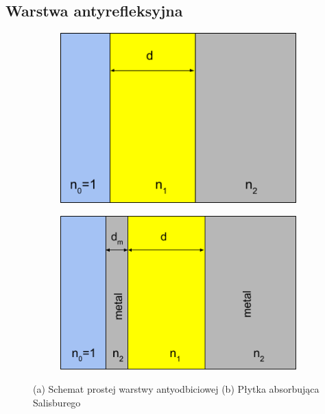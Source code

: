 \subsection{Warstwa antyrefleksyjna}
\begin{figure}[htb]
	\centering
        \begin{subfigure}{0.42\textwidth}
		\includegraphics[width=\textwidth]{images/pml/antiref.png}
                \caption{}
		\label{fig:antyref}
        \end{subfigure}
        \begin{subfigure}{0.47\textwidth}
                \includegraphics[width=\textwidth]{images/pml/sailsbury.png}
                \caption{}
		\label{fig:sailsburyschem}
        \end{subfigure}
        \caption{(a) Schemat prostej warstwy antyodbiciowej  (b) Płytka absorbująca Salisburego}
\end{figure}



